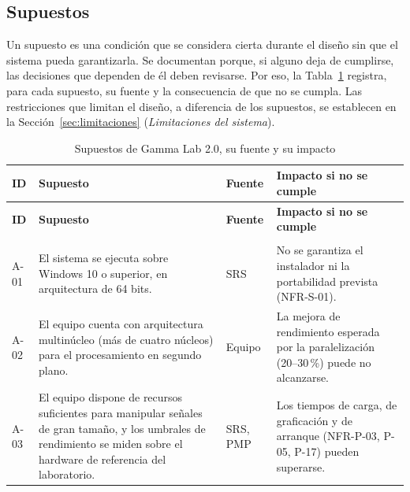 \documentclass[11pt,a4paper]{article}
\DeclareRobustCommand{\_}{\textunderscore\allowbreak}
\begin{document}
\subsection{Supuestos}
\label{sec:supuestos}

Un supuesto es una condición que se considera cierta durante el diseño sin que el sistema pueda garantizarla. Se documentan porque, si alguno deja de cumplirse, las decisiones que dependen de él deben revisarse. Por eso, la Tabla~\ref{tab:supuestos} registra, para cada supuesto, su fuente y la consecuencia de que no se cumpla. Las restricciones que limitan el diseño, a diferencia de los supuestos, se establecen en la Sección~\ref{sec:limitaciones} (\textit{Limitaciones del sistema}).

\begin{longtable}{@{}>{\raggedright\arraybackslash}p{1.1cm}
                  >{\raggedright\arraybackslash}p{6.2cm}
                  >{\raggedright\arraybackslash}p{1.9cm}
                  >{\raggedright\arraybackslash}p{5.5cm}@{}}

\caption{Supuestos de Gamma Lab 2.0, su fuente y su impacto} \label{tab:supuestos} \\
\toprule
\textbf{ID} &
\textbf{Supuesto} &
\textbf{Fuente} &
\textbf{Impacto si no se cumple} \\
\midrule
\endfirsthead

\toprule
\textbf{ID} &
\textbf{Supuesto} &
\textbf{Fuente} &
\textbf{Impacto si no se cumple} \\
\midrule
\endhead

\bottomrule
\endlastfoot

\multicolumn{4}{@{}l}{\textit{Entorno de ejecución}} \\
\addlinespace[2pt]

A-01 &
El sistema se ejecuta sobre Windows 10 o superior, en arquitectura de 64 bits.
&
SRS
&
No se garantiza el instalador ni la portabilidad prevista (NFR-S-01).
\\[0.15cm]

A-02 &
El equipo cuenta con arquitectura multinúcleo (más de cuatro núcleos) para el procesamiento en segundo plano.
&
Equipo
&
La mejora de rendimiento esperada por la paralelización (20--30\,\%) puede no alcanzarse.
\\[0.15cm]

A-03 &
El equipo dispone de recursos suficientes para manipular señales de gran tamaño, y los umbrales de rendimiento se miden sobre el hardware de referencia del laboratorio.
&
SRS, PMP
&
Los tiempos de carga, de graficación y de arranque (NFR-P-03, P-05, P-17) pueden superarse.
\\[0.15cm]


\end{longtable}
\end{document}
